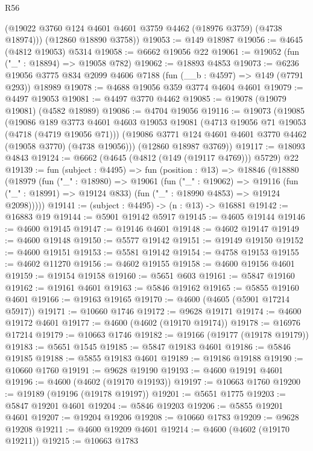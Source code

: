 \begin{lexlean}{R56}
\begin{coremodule}
        (@19022 @3760 @124 @4601 @4601 @3759 @4462 (@18976 @3759) (@4738 @18974)))
      (@12860 @18890 @3758))
@19053 := @149 @18987
@19056 := @4645 (@4812 @19053) @5314
@19058 := @6662 @19056 @22
@19061 := @19052 (fun ("_" : @18894) => @19058 @782)
@19062 := @18893 @4853
@19073 := @6236 @19056 @3775 @834 @2099 @4606 @7188 (fun (__b : @4597) => @149 (@7791 @293)) @18989
@19078 := @4688 @19056 @359 @3774 @4604 @4601
@19079 := @4497 @19053
@19081 := @4497 @3770 @4462
@19085 := @19078 (@19079 @19081) (@4582 @18989)
@19086 := @4704 @19056
@19116 := @19073
    (@19085
      (@19086
        @189
        @3773
        @4601
        @4603
        @19053
        @19081
        (@4713 @19056 @71 @19053 (@4718 (@4719 @19056 @71)))
        (@19086 @3771 @124 @4601 @4601 @3770 @4462 (@19058 @3770) (@4738 @19056)))
      (@12860 @18987 @3769))
@19117 := @18093 @4843
@19124 := @6662 (@4645 (@4812 (@149 (@19117 @4769))) @5729) @22
@19139 := fun (subject : @4495) =>
  fun (position : @13) =>
  @18846
    (@18880
      (@18979
        (fun ("_" : @18980) =>
        @19061
          (fun ("_" : @19062) =>
          @19116 (fun ("_" : @18991) => @19124 @833) (fun ("_" : @18990 @4853) => @19124 @2098)))))
@19141 := (subject : @4495) -> (n : @13) -> @16881
@19142 := @16883 @19
@19144 := @5901 @19142 @5917
@19145 := @4605 @19144
@19146 := @4600 @19145
@19147 := @19146 @4601
@19148 := @4602 @19147
@19149 := @4600 @19148
@19150 := @5577 @19142
@19151 := @19149 @19150
@19152 := @4600 @19151
@19153 := @5581 @19142
@19154 := @4758 @19153
@19155 := @4602 @11270
@19156 := @4602 @19155
@19158 := @4600 @19156 @4601
@19159 := @19154 @19158
@19160 := @5651 @603
@19161 := @5847 @19160
@19162 := @19161 @4601
@19163 := @5846 @19162
@19165 := @5855 @19160 @4601
@19166 := @19163 @19165
@19170 := @4600 (@4605 (@5901 @17214 @5917))
@19171 := @10660 @1746
@19172 := @9628 @19171
@19174 := @4600 @19172 @4601
@19177 := @4600 (@4602 (@19170 @19174))
@19178 := @16976 @17214
@19179 := @10663 @1746
@19182 := @19166 (@19177 (@19178 @19179))
@19183 := @5651 @1545
@19185 := @5847 @19183 @4601
@19186 := @5846 @19185
@19188 := @5855 @19183 @4601
@19189 := @19186 @19188
@19190 := @10660 @1760
@19191 := @9628 @19190
@19193 := @4600 @19191 @4601
@19196 := @4600 (@4602 (@19170 @19193))
@19197 := @10663 @1760
@19200 := @19189 (@19196 (@19178 @19197))
@19201 := @5651 @1775
@19203 := @5847 @19201 @4601
@19204 := @5846 @19203
@19206 := @5855 @19201 @4601
@19207 := @19204 @19206
@19208 := @10660 @1783
@19209 := @9628 @19208
@19211 := @4600 @19209 @4601
@19214 := @4600 (@4602 (@19170 @19211))
@19215 := @10663 @1783

\end{coremodule}
\end{lexlean}
